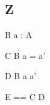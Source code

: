 \subsection{Z}
	\begin{zed}
	[A]
\end{zed}

\begin{schema}{B}
	a : A
\end{schema}

\begin{schema}{C}
	\Delta B
\where
	a = a'
\end{schema}

\begin{schema}{D}
	\Delta B
\where
	a \neq a'
\end{schema}

\begin{zed}
	E == C \semi D
\end{zed}

